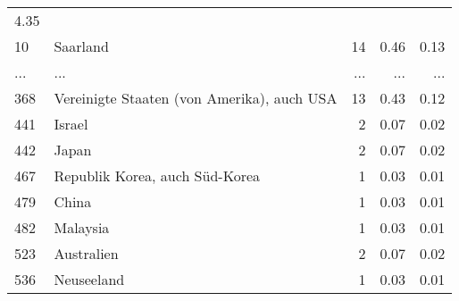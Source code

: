 \begin{longtable}{lXrrr}
          \num[round-mode=places,round-precision=2]{4,35} \\
        10 & \multicolumn{1}{X}{Saarland} & %
          \num{14} &
          \num[round-mode=places,round-precision=2]{0,46} &
          \num[round-mode=places,round-precision=2]{0,13} \\
       ... & ... & ... & ... & ... \\
        368 & \multicolumn{1}{X}{Vereinigte Staaten (von Amerika), auch USA} & %
          \num{13} &
          \num[round-mode=places,round-precision=2]{0,43} &
          \num[round-mode=places,round-precision=2]{0,12} \\

        441 & \multicolumn{1}{X}{Israel} & %
          \num{2} &
          \num[round-mode=places,round-precision=2]{0,07} &
          \num[round-mode=places,round-precision=2]{0,02} \\

        442 & \multicolumn{1}{X}{Japan} & %
          \num{2} &
          \num[round-mode=places,round-precision=2]{0,07} &
          \num[round-mode=places,round-precision=2]{0,02} \\

        467 & \multicolumn{1}{X}{Republik Korea, auch Süd-Korea} & %
          \num{1} &
          \num[round-mode=places,round-precision=2]{0,03} &
          \num[round-mode=places,round-precision=2]{0,01} \\

        479 & \multicolumn{1}{X}{China} & %
          \num{1} &
          \num[round-mode=places,round-precision=2]{0,03} &
          \num[round-mode=places,round-precision=2]{0,01} \\

        482 & \multicolumn{1}{X}{Malaysia} & %
          \num{1} &
          \num[round-mode=places,round-precision=2]{0,03} &
          \num[round-mode=places,round-precision=2]{0,01} \\

        523 & \multicolumn{1}{X}{Australien} & %
          \num{2} &
          \num[round-mode=places,round-precision=2]{0,07} &
          \num[round-mode=places,round-precision=2]{0,02} \\

        536 & \multicolumn{1}{X}{Neuseeland} & %
          \num{1} &
          \num[round-mode=places,round-precision=2]{0,03} &
          \num[round-mode=places,round-precision=2]{0,01} \\


\end{longtable}
